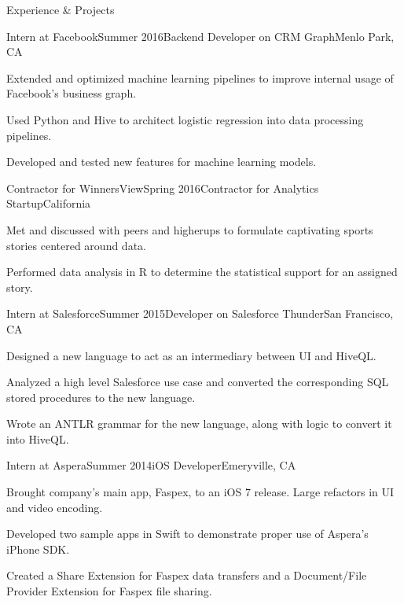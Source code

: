\documentclass{resume} %
\begin{document}

\begin{rSection}{Experience \& Projects}

\begin{rSubsection}{Intern at Facebook}{Summer 2016}{Backend Developer on CRM Graph}{Menlo Park, CA}
\item Extended and optimized machine learning pipelines to improve internal 
usage of Facebook's business graph.
\item Used Python and Hive to architect logistic regression into data 
processing pipelines.
\item Developed and tested new features for machine learning models.
\end{rSubsection}

\begin{rSubsection}{Contractor for WinnersView}{Spring 2016}{Contractor for Analytics Startup}{California}
\item Met and discussed with peers and higherups to formulate captivating 
sports stories centered around data.
\item Performed data analysis in R to determine the statistical support for 
an assigned story.
\end{rSubsection}

\begin{rSubsection}{Intern at Salesforce}{Summer 2015}{Developer on Salesforce Thunder}{San Francisco, CA}
\item Designed a new language to act as an intermediary between UI and HiveQL.
\item Analyzed a high level Salesforce use case and converted the corresponding SQL stored procedures to
the new language.
\item Wrote an ANTLR grammar for the new language, along with logic to convert it into HiveQL.
\end{rSubsection}


\begin{rSubsection}{Intern at Aspera}{Summer 2014}{iOS Developer}{Emeryville, CA}
\item Brought company's main app, Faspex, to an iOS 7 release. Large refactors in
    UI and video encoding.
\item Developed two sample apps in Swift to demonstrate proper use of Aspera's iPhone
    SDK.
\item Created a Share Extension for Faspex data transfers and a Document/File Provider Extension
    for Faspex file sharing.
\end{rSubsection}


\end{rSection}
\end{document}
